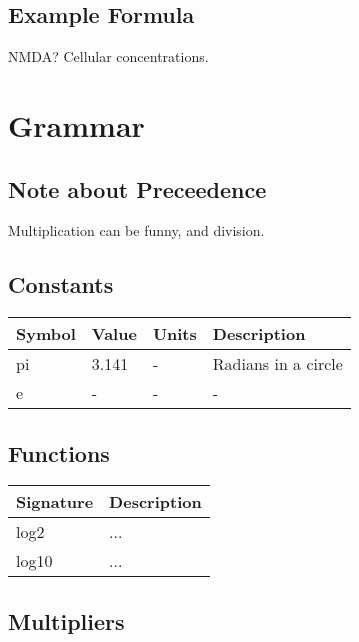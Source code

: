\documentclass{article}
\begin{document}
\subsection{Example Formula}
\begin{description}
\item NMDA? Cellular concentrations.
\end{description}



\newpage
\section*{Grammar}


\subsection*{Note about Preceedence}
Multiplication can be funny, and division.


\subsection*{Constants}
\begin{center}
    \begin{tabular}{ | l | l |  l | p{5cm} |}
    \hline
    Symbol & Value & Units & Description  \\ \hline
    pi & 3.141 & - & Radians in a circle \\ \hline
    e & - & - & - \\ \hline
    \end{tabular}
\end{center}

\subsection*{Functions}
\begin{center}
    \begin{tabular}{ | l |  p{5cm} |}
    \hline
    Signature &  Description  \\ \hline
    log2 & {...} \\ \hline
    log10 & {...} \\ \hline
    \end{tabular}
\end{center}


\subsection*{Multipliers}
\end{document}
